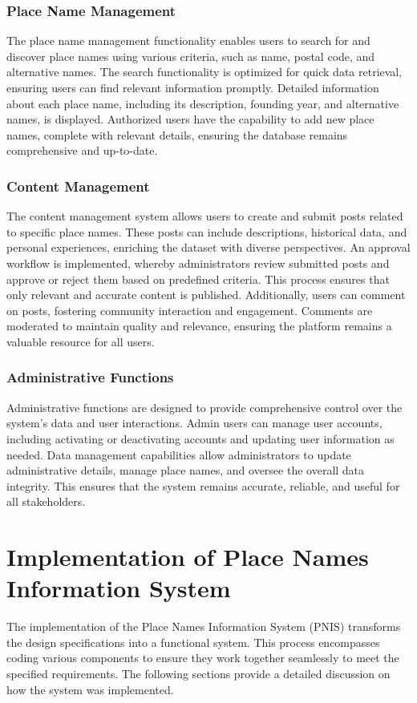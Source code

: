 \subsubsection{Place Name Management}
The place name management functionality enables users to search for and discover place names using various criteria, such as name, postal code, and alternative names. The search functionality is optimized for quick data retrieval, ensuring users can find relevant information promptly. Detailed information about each place name, including its description, founding year, and alternative names, is displayed. Authorized users have the capability to add new place names, complete with relevant details, ensuring the database remains comprehensive and up-to-date.

\subsubsection{Content Management}
The content management system allows users to create and submit posts related to specific place names. These posts can include descriptions, historical data, and personal experiences, enriching the dataset with diverse perspectives. An approval workflow is implemented, whereby administrators review submitted posts and approve or reject them based on predefined criteria. This process ensures that only relevant and accurate content is published. Additionally, users can comment on posts, fostering community interaction and engagement. Comments are moderated to maintain quality and relevance, ensuring the platform remains a valuable resource for all users.

\subsubsection{Administrative Functions}
Administrative functions are designed to provide comprehensive control over the system's data and user interactions. Admin users can manage user accounts, including activating or deactivating accounts and updating user information as needed. Data management capabilities allow administrators to update administrative details, manage place names, and oversee the overall data integrity. This ensures that the system remains accurate, reliable, and useful for all stakeholders.


\section{Implementation of Place Names Information System}
The implementation of the Place Names Information System (PNIS) transforms the design specifications into a functional system. This process encompasses coding various components to ensure they work together seamlessly to meet the specified requirements. The following sections provide a detailed discussion on how the system was implemented.

